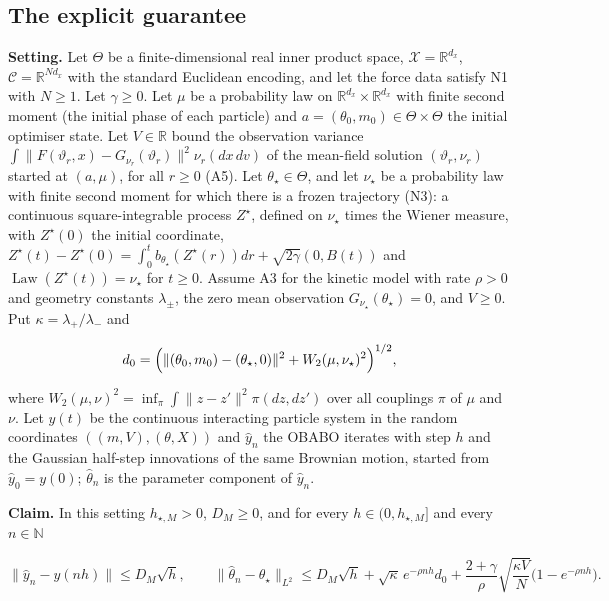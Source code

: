 \documentclass[11pt,a4paper]{report}
\begin{document}
\subsection{\texorpdfstring{The explicit guarantee}{The explicit guarantee}}


\textbf{Setting.} Let \(\Theta\) be a finite-dimensional real inner product space, \(\mathcal X=\mathbb R^{d_x}\), \(\mathcal C=\mathbb R^{Nd_x}\) with the standard Euclidean encoding, and let the force data satisfy N1 with \(N\ge1\). Let \(\gamma\ge0\). Let \(\mu\) be a probability law on \(\mathbb R^{d_x}\times\mathbb R^{d_x}\) with finite second moment (the initial phase of each particle) and \(a=(\theta_0,m_0)\in\Theta\times\Theta\) the initial optimiser state. Let \(V\in\mathbb R\) bound the observation variance \(\int\|F(\vartheta_r,x)-G_{\nu_r}(\vartheta_r)\|^2\nu_r(dx\,dv)\) of the mean-field solution \((\vartheta_r,\nu_r)\) started at \((a,\mu)\), for all \(r\ge0\) (A5). Let \(\theta_\star\in\Theta\), and let \(\nu_\star\) be a probability law with finite second moment for which there is a frozen trajectory (N3): a continuous square-integrable process \(Z^\star\), defined on \(\nu_\star\) times the Wiener measure, with \(Z^\star(0)\) the initial coordinate, \(Z^\star(t)-Z^\star(0)=\int_0^tb_{\theta_\star}(Z^\star(r))dr+\sqrt{2\gamma}(0,B(t))\) and \(\operatorname{Law}(Z^\star(t))=\nu_\star\) for \(t\ge0\). Assume A3 for the kinetic model with rate \(\rho>0\) and geometry constants \(\lambda_\pm\), the zero mean observation \(G_{\nu_\star}(\theta_\star)=0\), and \(V\ge0\). Put \(\kappa=\lambda_+/\lambda_-\) and


\[d_0=\Bigl(\|(\theta_0,m_0)-(\theta_\star,0)\|^2+W_2(\mu,\nu_\star)^2\Bigr)^{1/2},\]


where \(W_2(\mu,\nu)^2=\inf_\pi\int\|z-z'\|^2\pi(dz,dz')\) over all couplings \(\pi\) of \(\mu\) and \(\nu\). Let \(y(t)\) be the continuous interacting particle system in the random coordinates \(((m,V),(\theta,X))\) and \(\hat y_n\) the OBABO iterates with step \(h\) and the Gaussian half-step innovations of the same Brownian motion, started from \(\hat y_0=y(0)\); \(\hat\theta_n\) is the parameter component of \(\hat y_n\).




\textbf{Claim.} In this setting \(h_{\star,M}>0\), \(D_M\ge0\), and for every \(h\in(0,h_{\star,M}]\) and every \(n\in\mathbb N\)


\[\|\hat y_n-y(nh)\|\le D_M\sqrt h,\qquad\|\hat\theta_n-\theta_\star\|_{L^2}\le D_M\sqrt h+\sqrt\kappa\,e^{-\rho nh}d_0+\frac{2+\gamma}{\rho}\sqrt{\frac{\kappa V}{N}}\bigl(1-e^{-\rho nh}\bigr).\]
\end{document}
